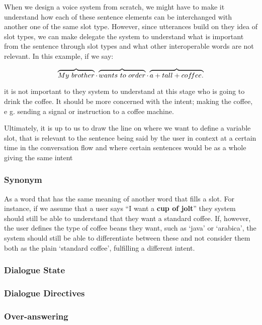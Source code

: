 	When we design a voice system from scratch, we might have to make it understand how each of these sentence elements can be interchanged with another one of the same slot type. However, since utterances build on they idea of slot types, we can make delegate the system to understand what is important from the sentence through slot types and what other interoperable words are not relevant. In this example, if we say:
	
	\[
	\overbrace{My \ brother} \cdot
	\overbrace{wants \ to \ order} \cdot
	\overbrace{ a + tall + cof\mkern-3mu fee.}
	\]
	

	it is not important to they system to understand at this stage who is going to drink the coffee. It should be more concerned with the intent; making the coffee, e g. sending a signal or instruction to a coffee machine.
	 
	Ultimately, it is up to us to draw the line on where we want to define a variable slot, that is relevant to the sentence being said by the user in context at a certain time in the conversation flow and where certain sentences would be as a whole giving the same intent
	
	
	\subsubsection*{Synonym}
	As a word that has the same meaning of another word that fills a slot. For instance, if we assume that a user says ``I want a \textbf{cup of jolt}'' they system should still be able to understand that they want a standard coffee. If, however, the user defines the type of coffee beans they want, such as `java' or `arabica', the system should still be able to differentiate between these and not consider them both as the plain `standard coffee', fulfilling a different intent. 
	
	\subsubsection*{Dialogue State}
	
	\subsubsection*{Dialogue Directives}
	
	\subsubsection*{Over-answering}
	
